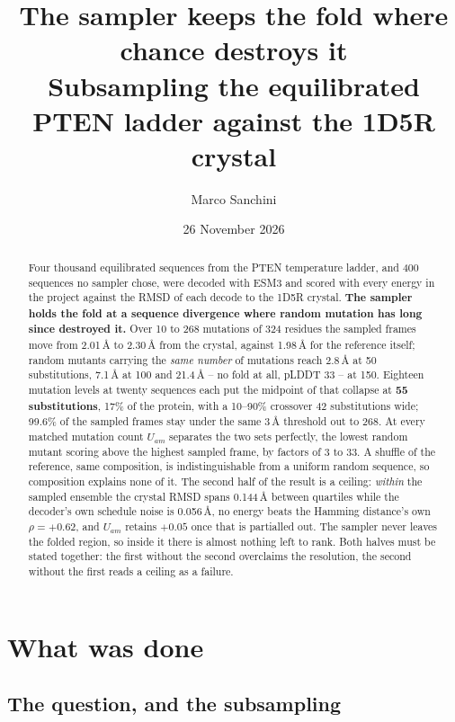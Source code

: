 \documentclass[11pt,a4paper]{article}
\title{The sampler keeps the fold where chance destroys it\\
\large Subsampling the equilibrated PTEN ladder against the 1D5R crystal}
\author{Marco Sanchini}
\date{26 November 2026}
\begin{document}
\maketitle

\begin{abstract}
\noindent
Four thousand equilibrated sequences from the PTEN temperature ladder, and 400 sequences no
sampler chose, were decoded with ESM3 and scored with every energy in the project against
the RMSD of each decode to the 1D5R crystal. \textbf{The sampler holds the fold at a
sequence divergence where random mutation has long since destroyed it.} Over 10 to 268
mutations of 324 residues the sampled frames move from 2.01\,\AA{} to 2.30\,\AA{} from the
crystal, against 1.98\,\AA{} for the reference itself; random mutants carrying the
\emph{same number} of mutations reach 2.8\,\AA{} at 50 substitutions, 7.1\,\AA{} at 100 and
21.4\,\AA{} -- no fold at all, pLDDT 33 -- at 150. Eighteen mutation levels at twenty
sequences each put the midpoint of that collapse at \textbf{55 substitutions}, 17\% of the
protein, with a 10--90\% crossover 42 substitutions wide; 99.6\% of the sampled frames stay
under the same 3\,\AA{} threshold out to 268. At every matched mutation count $U_{am}$
separates the two sets perfectly, the lowest random mutant scoring above the highest
sampled frame, by factors of 3 to 33. A shuffle of the reference, same composition, is
indistinguishable from a uniform random sequence, so composition explains none of it.
The second half of the result is a ceiling: \emph{within} the sampled ensemble the crystal
RMSD spans 0.144\,\AA{} between quartiles while the decoder's own schedule noise is
0.056\,\AA, no energy beats the Hamming distance's own $\rho=+0.62$, and $U_{am}$ retains
$+0.05$ once that is partialled out. The sampler never leaves the folded region, so inside
it there is almost nothing left to rank. Both halves must be stated together: the first
without the second overclaims the resolution, the second without the first reads a ceiling
as a failure.
\end{abstract}

\section{What was done}

\subsection{The question, and the subsampling}
\end{document}

